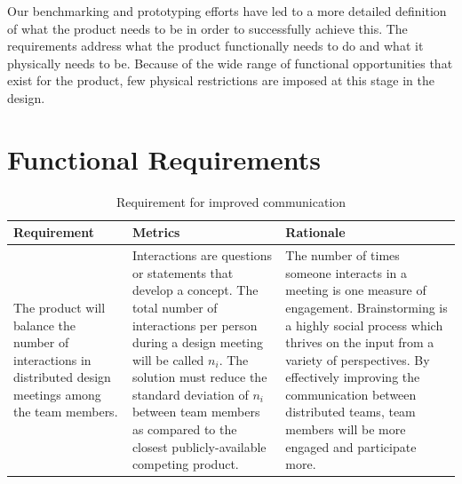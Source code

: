 Our benchmarking and prototyping efforts have led to a more detailed definition of what the product needs to be in order to successfully achieve this.  The requirements address what the product functionally needs to do and what it physically needs to be. Because of the wide range of functional opportunities that exist for the product, few physical restrictions are imposed at this stage in the design. 

\section{Functional Requirements}
\label{sec:functionalreqs}

\begin{table}[!h]
	\centering
		\begin{tabular}{| p{42mm} | p{42mm} | p{51mm} |}
		\hline
		\textbf{Requirement}	& \textbf{Metrics} & \textbf{Rationale}\\
		\hline
The product will balance the number of interactions in distributed design meetings among the team members. &	Interactions are questions or statements that develop a concept. The total number of interactions per person during a design meeting will be called $n_{i}$. The solution must reduce the standard deviation of $n_{i}$ between team members as compared to the closest publicly-available competing product.	& The number of times someone interacts in a meeting is one measure of engagement. Brainstorming is a highly social process which thrives on the input from a variety of perspectives. By effectively improving the communication between distributed teams, team members will be more engaged and participate more.\\
\hline
		\end{tabular}
	\caption{Requirement for improved communication}
	\label{tab:mediums1}
\end{table}


